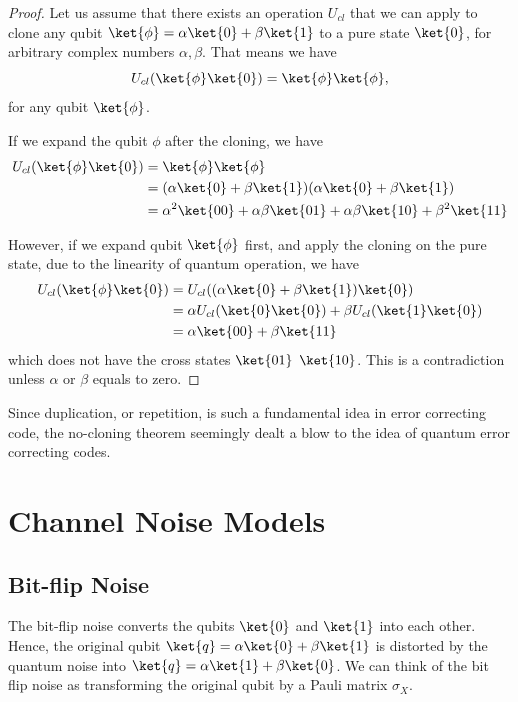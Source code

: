 \begin{proof}
Let us assume that there exists an operation \(U_{cl}\) that we can apply to clone any qubit \(\ket{\phi} = \alpha \ket{0} + \beta \ket{1}\) to a pure state \(\ket{0}\), for arbitrary complex numbers \(\alpha, \beta\). That means we have 
\[U_{cl}(\ket{\phi}\ket{0}) = \ket{\phi}\ket{\phi},\]
for any qubit \(\ket{\phi}\).

If we expand the qubit \(\phi\) after the cloning, we have 
\begin{align*}
    U_{cl}(\ket{\phi} \ket{0}) &= \ket{\phi}\ket{\phi} \\
           &= (\alpha \ket{0} + \beta \ket{1})(\alpha \ket{0} + \beta \ket{1}) \\
           &= \alpha^2 \ket{00} + \alpha\beta\ket{01} + \alpha\beta\ket{10} + \beta^2 \ket{11}
\end{align*}

However, if we expand qubit \(\ket{\phi}\) first, and apply the cloning on the pure state, due to the linearity of quantum operation, we have 
\begin{align*}
   U_{cl} (\ket{\phi} \ket{0})  &= U_{cl}((\alpha \ket{0} + \beta \ket{1}) \ket{0}) \\
           &= \alpha U_{cl}(\ket{0}\ket{0}) +  \beta U_{cl}(\ket{1}\ket{0}) \\
           &= \alpha \ket{00} + \beta \ket{11}
\end{align*}
which does not have the cross states \(\ket{01}\) \(\ket{10}\). This is a contradiction unless \(\alpha\) or \(\beta\) equals to zero. 
\end{proof}

Since duplication, or repetition, is such a fundamental idea in error correcting code, the no-cloning theorem seemingly dealt a blow to the idea of quantum error correcting codes.

\section{Channel Noise Models}

\subsection{Bit-flip Noise}
The bit-flip noise converts the qubits 
\(\ket{0}\) and \(\ket{1}\) into each other. Hence, the original qubit \(\ket{q} = \alpha \ket{0} + \beta \ket{1}\) is distorted by the quantum noise into \(\ket{q} = \alpha \ket{1} + \beta \ket{0}\). We can think of the bit flip noise as transforming the original qubit by a Pauli matrix \(\sigma_X\).

